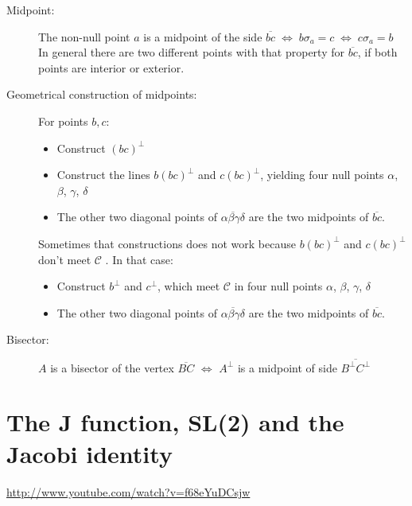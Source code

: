 \documentclass[DIV16,halfparskip]{scrartcl}
\newcommand{\nullcm}{\mathcal C}
\newcommand{\nullconic}{$\nullcm$ }
\begin{document}
\begin{description}
    \item [Midpoint:] The non-null point $a$ is a midpoint of the side
        $\overline{bc} \;\Leftrightarrow\; b\sigma_a = c
        \;\Leftrightarrow\; c\sigma_a = b$\\
        In general there are two different points with that property for
        $\overline{bc}$, if both points are interior or exterior.

    \item [Geometrical construction of midpoints:] For points $b, c$:
        \begin{itemize}
            \item Construct $(bc)^\perp$
            \item Construct the lines $b(bc)^\perp$ and $c(bc)^\perp$, yielding
                four null points $\alpha$, $\beta$, $\gamma$, $\delta$
            \item The other two diagonal points of
                $\overline{\alpha\beta\gamma\delta}$ are the two midpoints of
                $\overline{bc}$.
        \end{itemize}

        Sometimes that constructions does not work because $b(bc)^\perp$ and
        $c(bc)^\perp$ don't meet \nullconic. In that case:
        \begin{itemize}
            \item Construct $b^\perp$ and $c^\perp$, which meet \nullconic in
                four null points $\alpha$, $\beta$, $\gamma$, $\delta$
            \item The other two diagonal points of
                $\overline{\alpha\beta\gamma\delta}$ are the two midpoints of
                $\overline{bc}$.
        \end{itemize}

    \item [Bisector:] $A$ is a bisector of the vertex $\overline{BC}$
        $\Leftrightarrow$ $A^\perp$ is a midpoint of side
        $\overline{B^\perp C^\perp}$

\end{description}

\section{The J function, SL(2) and the Jacobi identity}
\url{http://www.youtube.com/watch?v=f68eYuDCsjw}
\end{document}
